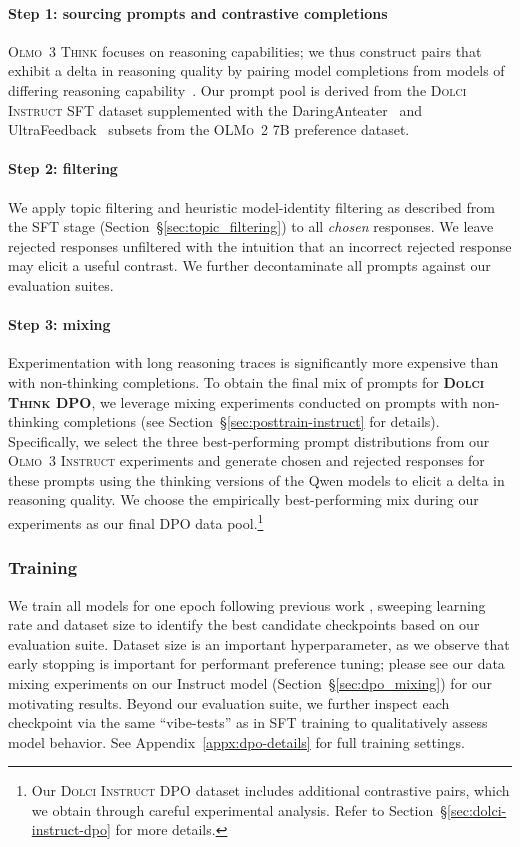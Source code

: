 \documentclass[table]{ai2style/ai2}
\newcommand{\oldOlmo}{OLMo\xspace}
\newcommand{\newOlmo}{Olmo\xspace}
\newcommand{\olmotoo}{\textsc{\oldOlmo~2}\xspace}
\newcommand{\olmothreeinstruct}{\textsc{\newOlmo~3 Instruct}\xspace}
\newcommand{\olmothreethinking}{\textsc{Olmo~3 Think}\xspace}
\newcommand{\dolcithinkdpo}{\textsc{Dolci Think DPO}\xspace}
\newcommand{\dolciinstructsft}{\textsc{Dolci Instruct SFT}\xspace}
\newcommand{\dolciinstructdpo}{\textsc{Dolci Instruct DPO}\xspace}
\begin{document}
\paragraph{Step 1: sourcing prompts and contrastive completions}  \olmothreethinking focuses on reasoning capabilities; we thus construct pairs that exhibit a delta in reasoning quality by pairing model completions from models of differing reasoning capability~\citep{geng2025delta, bakouch2025smollm3, kim2023aligning}.
Our prompt pool is derived from the \dolciinstructsft dataset supplemented with the DaringAnteater~\citep{wang2024helpsteer2} and UltraFeedback~\citep{cui2023ultrafeedback} subsets from the \olmotoo 7B preference dataset.

\paragraph{Step 2: filtering}
We apply topic filtering and heuristic model-identity filtering as described from the SFT stage (Section~\S\ref{sec:topic_filtering}) to all \textit{chosen} responses. We leave rejected responses unfiltered with the intuition that an incorrect rejected response may elicit a useful contrast. We further decontaminate all prompts against our evaluation suites.

\paragraph{Step 3: mixing}
Experimentation with long reasoning traces is significantly more expensive than with non-thinking completions.
To obtain the final mix of prompts for {\bf \dolcithinkdpo}, we leverage mixing experiments conducted on prompts with non-thinking completions (see Section~\S\ref{sec:posttrain-instruct} for details).
Specifically, we select the three best-performing prompt distributions from our \olmothreeinstruct experiments and generate chosen and rejected responses for these prompts using the thinking versions of the Qwen models to elicit a delta in reasoning quality. We choose the empirically best-performing mix during our experiments as our final DPO data pool.\footnote{Our \dolciinstructdpo dataset includes additional contrastive pairs, which we obtain through careful experimental analysis. Refer to Section~\S\ref{sec:dolci-instruct-dpo} for more details.}

\subsubsection{Training}
We train all models for one epoch following previous work \citep{lambert2024tulu3}, sweeping learning rate and dataset size to identify the best candidate checkpoints based on our evaluation suite. Dataset size is an important hyperparameter, as we observe that early stopping is important for performant preference tuning; please see our data mixing experiments on our Instruct model (Section~\S\ref{sec:dpo_mixing}) for our motivating results. Beyond our evaluation suite, we further inspect each checkpoint via the same ``vibe-tests'' as in SFT training to qualitatively assess model behavior. See Appendix~\ref{appx:dpo-details} for full training settings.
\end{document}
